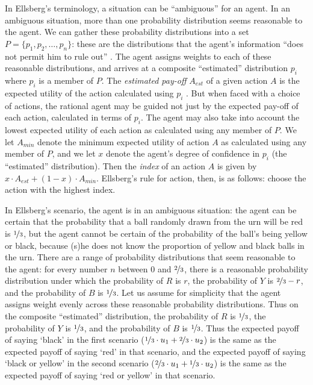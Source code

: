 In Ellsberg's terminology, a situation can be ``ambiguous'' for an agent. In an ambiguous situation, more than one probability distribution seems reasonable to the agent. We can gather these probability distributions into a set $P = \{p_1, p_2, \ldots, p_n\}$: these are the distributions that the agent's information ``does not permit him to rule out'' \citep[661]{ellsberg1961}. The agent assigns weights to each of these reasonable distributions, and arrives at a composite ``estimated'' distribution $p_i$ where $p_i$ is a member of $P$. The \textit{estimated pay-off} $A_{est}$ of a given action $A$ is the expected utility of the action calculated using $p_i$ \citep[661]{ellsberg1961}.  But when faced with a choice of actions, the rational agent may be guided not just by the expected pay-off of each action, calculated in terms of $p_i$. The agent may also take into account the lowest expected utility of each action as calculated using any member of $P$. We let $A_{min}$ denote the minimum expected utility of action $A$ as calculated using any member of $P$, and we let $x$ denote the agent's degree of confidence in $p_i$ (the ``estimated'' distribution). Then the \textit{index} of an action $A$ is given by $x \cdot A_{est} + (1-x) \cdot A_{min}$. Ellsberg's rule for action, then, is as follows: choose the action with the highest index. 

In Ellsberg's scenario, the agent is in an ambiguous situation: the agent can be certain that the probability that a ball randomly drawn from the urn will be red is $\nicefrac{1}{3}$, but the agent cannot be certain of the probability of the ball's being yellow or black, because (s)he does not know the proportion of yellow and black balls in the urn. There are a range of probability distributions that seem reasonable to the agent: for every number $n$ between $0$ and $\nicefrac{2}{3}$, there is a reasonable probability distribution under which the probability of $R$ is $r$, the probability of $Y$ is $\nicefrac{2}{3}-r$, and the probability of $B$ is $\nicefrac{1}{3}$. Let us assume for simplicity that the agent assigns weight evenly across these reasonable probability distributions. Thus on the composite ``estimated'' distribution, the probability of $R$ is $\nicefrac{1}{3}$, the probability of $Y$ is $\nicefrac{1}{3}$, and the probability of $B$ is $\nicefrac{1}{3}$. Thus the expected payoff of saying `black' in the first scenario ($\nicefrac{1}{3} \cdot u_1 + \nicefrac{2}{3} \cdot u_2$) is the same as the expected payoff of saying `red' in that scenario, and the expected payoff of saying `black or yellow' in the second scenario ($\nicefrac{2}{3} \cdot u_1 + \nicefrac{1}{3} \cdot u_2$) is the same as the expected payoff of saying `red or yellow' in that scenario.
 
